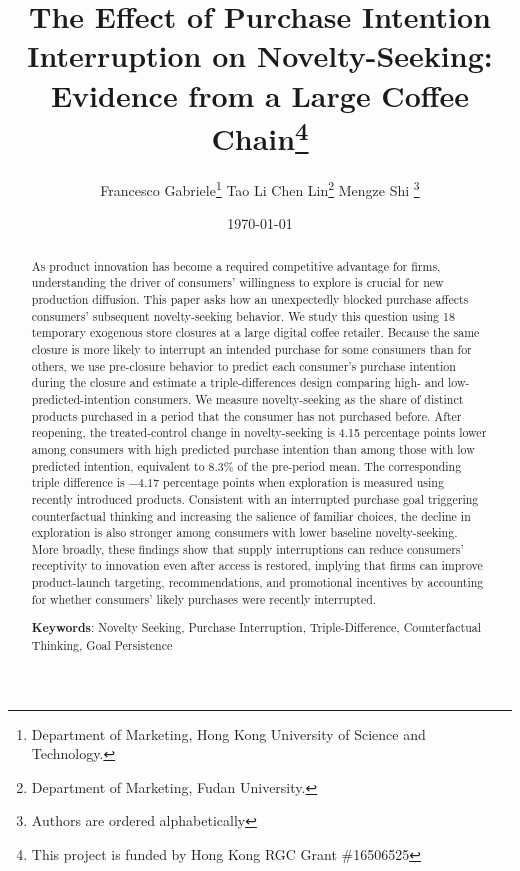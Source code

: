 \documentclass[11 pt]{article}
\title{\Large The Effect of Purchase Intention Interruption on Novelty-Seeking: \\
Evidence from a Large Coffee Chain\footnote{This project is funded by Hong Kong RGC Grant \#16506525}}
\author{Francesco Gabriele\thanks{Department of Marketing, Hong Kong University of Science and Technology.} \quad Tao Li \footnotemark[2] \quad Chen Lin\thanks{Department of Marketing, Fudan University.} \quad Mengze Shi \footnotemark[2] \quad\thanks{Authors are ordered alphabetically}}
\date{\today}
\begin{document}
\maketitle
\doublespacing

\setcounter{page}{0}

\begin{abstract}
    \tiny \renewcommand{\baselinestretch}{1.2} \normalsize
    \singlespacing
    \noindent
    As product innovation has become a required competitive advantage for firms, understanding the driver of consumers' willingness to explore is crucial for new production diffusion. This paper asks how an unexpectedly blocked purchase affects consumers' subsequent novelty-seeking behavior. We study this question using 18 temporary exogenous store closures at a large digital coffee retailer. Because the same closure is more likely to interrupt an intended purchase for some consumers than for others, we use pre-closure behavior to predict each consumer's purchase intention during the closure and estimate a triple-differences design comparing high- and low-predicted-intention consumers. We measure novelty-seeking as the share of distinct products purchased in a period that the consumer has not purchased before. After reopening, the treated-control change in novelty-seeking is 4.15 percentage points lower among consumers with high predicted purchase intention than among those with low predicted intention, equivalent to 8.3\% of the pre-period mean. The corresponding triple difference is $-4.17$ percentage points when exploration is measured using recently introduced products. Consistent with an interrupted purchase goal triggering counterfactual thinking and increasing the salience of familiar choices, the decline in exploration is also stronger among consumers with lower baseline novelty-seeking. More broadly, these findings show that supply interruptions can reduce consumers' receptivity to innovation even after access is restored, implying that firms can improve product-launch targeting, recommendations, and promotional incentives by accounting for whether consumers' likely purchases were recently interrupted.

    \par\smallskip
    \noindent \textbf{Keywords}: Novelty Seeking, Purchase Interruption, Triple-Difference, Counterfactual Thinking, Goal Persistence
\end{abstract}

\thispagestyle{empty}
\newpage
\setcounter{page}{1}
\end{document}
